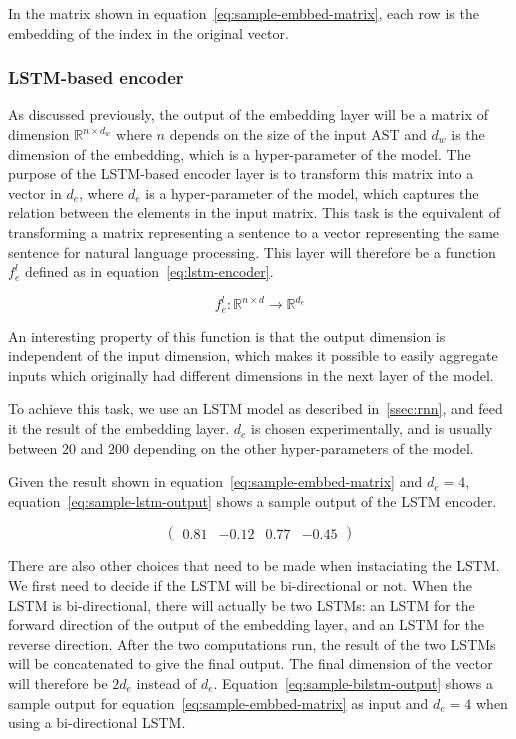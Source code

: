 In the matrix shown in equation~\ref{eq:sample-embbed-matrix}, each row is the
embedding of the index in the original vector.
%
\subsubsection{\label{sssec:lstm-encoder}LSTM-based encoder}
As discussed previously, the output of the embedding layer will be a matrix of
dimension $\mathbb{R}^{n\times d_w}$ where $n$ depends on the size of
the input AST and $d_w$ is the dimension of the embedding, which is a
hyper-parameter of the model. The purpose of the LSTM-based encoder layer is to
transform this matrix into a vector in $d_e$, where $d_e$ is a hyper-parameter of
the model, which captures the relation between the elements in the input matrix.
This task is the equivalent of transforming a matrix representing a sentence to
a vector representing the same sentence for natural language processing.
This layer will therefore be a function $f_e^l$ defined as in
equation~\ref{eq:lstm-encoder}.

\begin{equation}
  \label{eq:lstm-encoder}
  f_e^l : \mathbb{R}^{n\times d} \rightarrow \mathbb{R}^{d_e}
\end{equation}

An interesting property of this function is that the output dimension is
independent of the input dimension, which makes it possible to easily aggregate
inputs which originally had different dimensions in the next layer of the model.

To achieve this task, we use an LSTM model as described in~\ref{ssec:rnn}, and
feed it the result of the embedding layer. $d_e$ is chosen experimentally, and is
usually between $20$ and $200$ depending on the other hyper-parameters of the
model.

Given the result shown in equation~\ref{eq:sample-embbed-matrix} and $d_e = 4$,
equation~\ref{eq:sample-lstm-output} shows a sample output of the LSTM encoder.

\begin{equation}
  \label{eq:sample-lstm-output}
  \begin{pmatrix}
    0.81 & -0.12 & 0.77 & -0.45
  \end{pmatrix}
\end{equation}

There are also other choices that need to be made when instaciating the
LSTM. We first need to decide if the LSTM will be bi-directional or not. When
the LSTM is bi-directional, there will actually be two LSTMs: an LSTM for the
forward direction of the output of the embedding layer, and an LSTM for the
reverse direction. After the two computations run, the result of the two LSTMs
will be concatenated to give the final output. The final dimension of the vector
will therefore be $2d_e$ instead of $d_e$. Equation~\ref{eq:sample-bilstm-output}
shows a sample output for equation~\ref{eq:sample-embbed-matrix} as input and
$d_e = 4$ when using a bi-directional LSTM.

